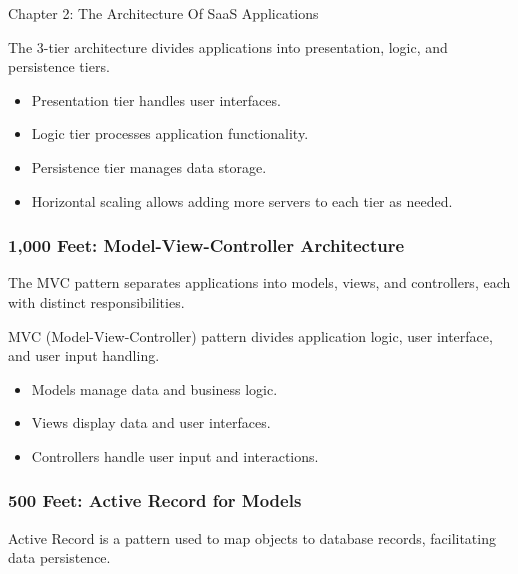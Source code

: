 \begin{notes}{Chapter 2: The Architecture Of SaaS Applications}
\begin{highlight}
        The 3-tier architecture divides applications into presentation, logic, and persistence tiers.
        
        \begin{itemize}
            \item Presentation tier handles user interfaces.
            \item Logic tier processes application functionality.
            \item Persistence tier manages data storage.
            \item Horizontal scaling allows adding more servers to each tier as needed.
        \end{itemize}
    
    \end{highlight}
    
    \subsubsection*{1,000 Feet: Model-View-Controller Architecture}
    
    The MVC pattern separates applications into models, views, and controllers, each with distinct responsibilities.
    
    \begin{highlight}
    
        MVC (Model-View-Controller) pattern divides application logic, user interface, and user input handling.
        
        \begin{itemize}
            \item Models manage data and business logic.
            \item Views display data and user interfaces.
            \item Controllers handle user input and interactions.
        \end{itemize}
    
    \end{highlight}
    
    \subsubsection*{500 Feet: Active Record for Models}
    
    Active Record is a pattern used to map objects to database records, facilitating data persistence.
    
    \begin{highlight}
    

\end{highlight}
\end{notes}
